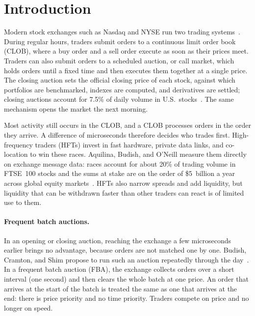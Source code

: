 \section{Introduction}
\label{sec:intro}

Modern stock exchanges such as Nasdaq and NYSE run two trading systems~\cite{harris2003}. During regular hours, traders submit orders to a continuous limit order book (CLOB), where a buy order and a sell order execute as soon as their prices meet. Traders can also submit orders to a scheduled auction, or call market, which holds orders until a fixed time and then executes them together at a single price. The closing auction sets the official closing price of each stock, against which portfolios are benchmarked, indexes are computed, and derivatives are settled; closing auctions account for 7.5\% of daily volume in U.S.\ stocks~\cite{bogousslavsky2023}. The same mechanism opens the market the next morning.

Most activity still occurs in the CLOB, and a CLOB processes orders in the order they arrive. A difference of microseconds therefore decides who trades first. High-frequency traders (HFTs) invest in fast hardware, private data links, and co-location to win these races. Aquilina, Budish, and O'Neill measure them directly on exchange message data: races account for about 20\% of trading volume in FTSE~100 stocks and the sums at stake are on the order of \$5~billion a year across global equity markets~\cite{aquilina2022}. HFTs also narrow spreads and add liquidity, but liquidity that can be withdrawn faster than other traders can react is of limited use to them.

\paragraph{Frequent batch auctions.}
In an opening or closing auction, reaching the exchange a few microseconds earlier brings no advantage, because orders are not matched one by one. Budish, Cramton, and Shim propose to run such an auction repeatedly through the day~\cite{budish2015,budish2014}. In a frequent batch auction (FBA), the exchange collects orders over a short interval (\eg one second) and then clears the whole batch at one price. An order that arrives at the start of the batch is treated the same as one that arrives at the end: there is price priority and no time priority. Traders compete on price and no longer on speed.

